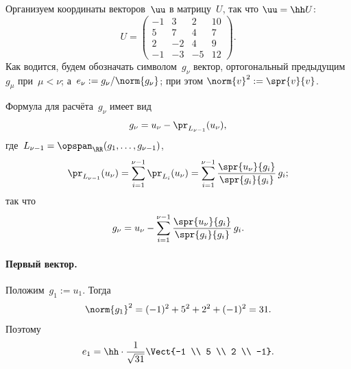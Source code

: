 \begin{solution}
	Организуем координаты векторов~$\uu$ в матрицу~$U$, так что $\uu = \hh U$:
	\[
		U =
		\left( 
			\begin{array}{r|r|r|r}
				-1 & 3 & 2 & 10
				\\
				5 & 7 & 4 & 7
				\\
				2 & -2 & 4 & 9
				\\
				-1 & -3 & -5 & 12
			\end{array}
		\right)
		.
	\]
	Как водится, будем обозначать символом~$g_\nu$ вектор, ортогональный предыдущим~$g_\mu$ при~$\mu < \nu$; а~$e_\nu := g_\nu / \norm{g_\nu}$; при этом $\norm{v}^2 := \spr{v}{v}$.

	Формула для расчёта~$g_\nu$ имеет вид
	\[
		g_\nu =
		u_\nu - \pr_{L_{\nu-1}}(u_\nu),
	\]
	где~$L_{\nu-1} = \opspan_\RR(g_1, \dots, g_{\nu-1})$,
	\[
		\pr_{L_{\nu-1}}(u_\nu) =
		\sum_{i = 1}^{\nu-1}
			\pr_{L_i}(u_\nu)
		=
		\sum_{i = 1}^{\nu-1}
			\frac{\spr{u_\nu}{g_i}}{\spr{g_i}{g_i}}\,
			g_i
		;
	\]
	так что
	\begin{equation}
		\label{eq:num_07:g}
		g_\nu =
		u_\nu -
		\sum_{i=1}^{\nu-1}
			\frac{\spr{u_\nu}{g_i}}{\spr{g_i}{g_i}}\,
			g_i
		.
	\end{equation}

	\paragraph{Первый вектор.}
	Положим~$g_1 := u_1$. Тогда
	\[
		\norm{g_1}^2 =
		(-1)^2 + 5^2 + 2^2 + (-1)^2 =
		31.
	\]
	Поэтому
	\[
		e_1 =
		\hh
		\cdot
		\frac{1}{\sqrt{31}}
		\Vect{-1 \\ 5 \\ 2 \\ -1}
		.
	\]


\end{solution}
